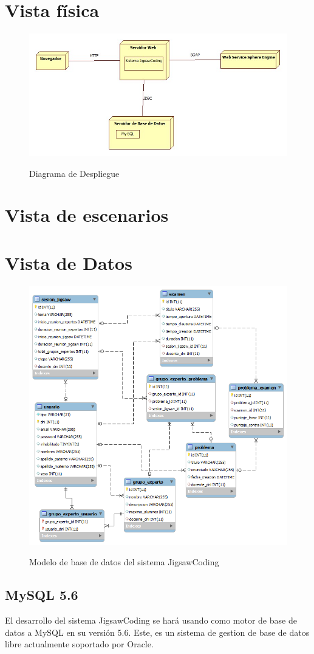 \section{Vista física}
\begin{figure}[!h]
  \centering
  \includegraphics[scale=0.5]{figuras/sad/diagrama_de_despliegue.jpg}\\
  \caption{Diagrama de Despliegue}\label{fig:diagrama_de_despliegue}
\end{figure}
\section{Vista de escenarios}
\clearpage
\section{Vista de Datos}
\begin{figure}[!h]
  \centering
  \includegraphics[scale=0.6]{figuras/sad/modelo_de_datos.png}\\
  \caption[Modelo de datos]{Modelo de base de datos del sistema JigsawCoding}\label{fig:modelo_de_datos}
\end{figure} 
\subsection{MySQL 5.6}
El desarrollo del sistema JigsawCoding se hará usando como motor de base de datos a MySQL en su versión 5.6. Este, es un sistema de gestion de base de datos libre actualmente soportado por Oracle. 